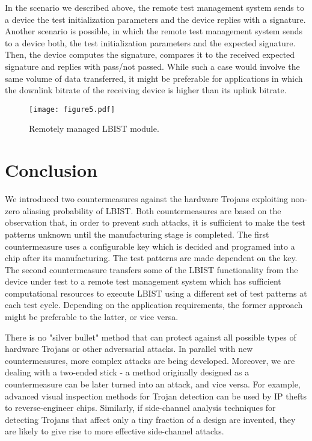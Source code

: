 \documentclass[a4paper]{llncs}
\begin{document}
In the scenario we described above, the remote test management system sends to a device the test initialization parameters and the device replies with a signature.  
Another scenario is possible, in which the remote test management system sends to a device both, the test initialization parameters and the expected signature. Then, the device computes the signature, compares it to the received expected signature and replies with pass/not passed. While such a case would involve the same volume of data transferred, it
might be preferable for applications in which the downlink bitrate of the receiving device is higher than its uplink bitrate.

\begin{figure}[t!]
\begin{center}
\texttt{[image: figure5.pdf]}
\caption{Remotely managed LBIST module.}\label{f6} 
\end{center}
\end{figure}

\section{Conclusion} \label{con} 

We introduced two countermeasures against the hardware Trojans exploiting non-zero aliasing probability of LBIST. Both countermeasures are based on the observation that, in order to prevent such attacks, it is sufficient to make the test patterns unknown until the manufacturing stage is completed. The first countermeasure uses a configurable key which is decided and programed into a chip after its manufacturing. The test patterns are made dependent on the key. 
The second countermeasure transfers some of the LBIST functionality from the device under test to a remote test management system which has sufficient computational resources to execute LBIST using a different set of test patterns at each test cycle. 
Depending on the application requirements, the former approach might be preferable to the latter, or vice versa.



There is no "silver bullet" method that can protect against all possible types of hardware Trojans or other adversarial attacks. In parallel with new countermeasures, more complex attacks are being developed. 
Moreover, we are dealing with a two-ended stick - a method originally designed as a countermeasure can be later turned into an attack, and vice versa.  
For example, advanced visual inspection methods for Trojan detection can be used by IP thefts to reverse-engineer chips.
Similarly, if side-channel analysis techniques for detecting Trojans that affect only a tiny fraction of a design are invented, they are likely to give rise to more effective side-channel attacks.
\end{document}
